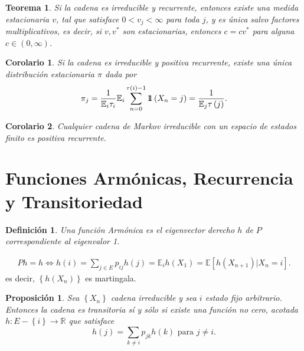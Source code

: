 \documentclass{article}
\newtheorem{Def}{Definición}
\newtheorem{Teo}{Teorema}
\newtheorem{Prop}{Proposición}
\newtheorem{Cor}{Corolario}
\newcommand{\rea}{\mathbb{R}}
\newcommand{\esp}{\mathbb{E}}
\newcommand{\indora}{\mbox{$1$\hspace{-0.8ex}$1$}}
\begin{document}
\begin{Teo}\label{Teo.3.3}
Si la cadena es irreducible y recurrente, entonces existe una medida estacionaria $v$, tal que satisface $0<v_{j}<\infty$ para toda $j$, y es \'unica salvo factores multiplicativos, es decir, si $v,v^{*}$ son estacionarias, entonces $c=cv^{*}$ para alguna $c\in\left(0,\infty\right)$.
\end{Teo}

\begin{Cor}\label{Cor.3.5}
Si la cadena es irreducible y positiva recurrente, existe una
\'unica distribuci\'on estacionaria $\pi$ dada por
\begin{equation}
\pi_{j}=\frac{1}{\esp_{i}\tau_{i}}\esp_{i}\sum_{n=0}^{\tau\left(i\right)-1}\indora\left(X_{n}=j\right)=\frac{1}{\esp_{j}\tau\left(j\right)}.
\end{equation}
\end{Cor}

\begin{Cor}\label{Cor.3.6}
Cualquier cadena de Markov irreducible con un espacio de estados finito es positiva recurrente.
\end{Cor}
%
\section{Funciones Arm\'onicas, Recurrencia y Transitoriedad}
%
\begin{Def}\label{Def.Armonica}
Una funci\'on Arm\'onica es el eigenvector derecho $h$ de $P$ correspondiente al eigenvalor 1.
\end{Def}
\begin{eqnarray*}
Ph=h\Leftrightarrow h\left(i\right)=\sum_{j\in E}p_{ij}h\left(j\right)=\esp_{i}h\left(X_{1}\right)=\esp\left[h\left(X_{n+1}\right)|X_{n}=i\right].
\end{eqnarray*}
es decir, $\left\{h\left(X_{n}\right)\right\}$ es martingala.
\begin{Prop}\label{Prop.5.2}
Sea $\left\{X_{n}\right\}$ cadena irreducible  y sea $i$ estado fijo arbitrario. Entonces la cadena es transitoria s\'i y s\'olo si existe una funci\'on no cero, acotada $h:E-\left\{i\right\}\rightarrow\rea$ que satisface
\begin{equation}\label{Eq.5.1}
h\left(j\right)=\sum_{k\neq i}p_{jk}h\left(k\right)\textrm{   para }j\neq i.
\end{equation}
\end{Prop}
\end{document}
